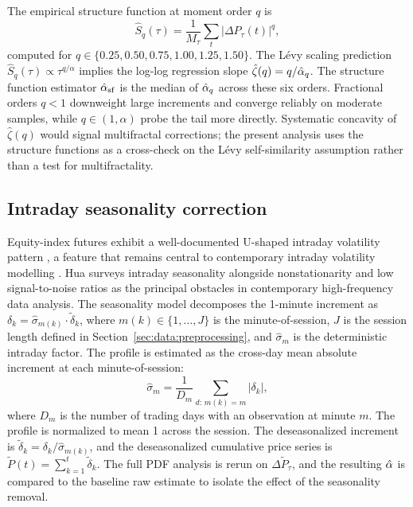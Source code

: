 \documentclass[conference]{IEEEtran}
\begin{document}
The empirical structure function at moment order $q$ is
\begin{equation}
  \hat{S}_q(\tau)
  = \frac{1}{M_\tau}\sum_t |\Delta P_\tau(t)|^q,
  \label{eq:sf}
\end{equation}
computed for $q\in\{0.25,0.50,0.75,1.00,1.25,1.50\}$.
The Lévy scaling prediction $\hat{S}_q(\tau) \propto \tau^{q/\alpha}$ implies
the log-log regression slope $\hat\zeta(q) = q/\hat{\alpha}_q$. The
structure function estimator $\hat{\alpha}_{\mathrm{sf}}$ is the median of
$\hat{\alpha}_q$ across these six orders. Fractional orders $q<1$ downweight
large increments and converge reliably on moderate samples, while
$q\in(1,\alpha)$ probe the tail more directly. Systematic concavity of
$\hat\zeta(q)$ would signal multifractal corrections; the present analysis
uses the structure functions as a cross-check on the Lévy self-similarity
assumption rather than a test for multifractality.

\subsection{Intraday seasonality correction}
\label{sec:methodology:seasonality}

Equity-index futures exhibit a well-documented U-shaped intraday volatility
pattern \cite{AndersenBollerslev1997,Chakraborti2011}, a
feature that remains central to contemporary intraday volatility
modelling \cite{Liang2023,Zhang2024}. Hua \cite{Hua2025} surveys intraday
seasonality alongside nonstationarity and low signal-to-noise ratios as the
principal obstacles in contemporary high-frequency data analysis. The
seasonality model decomposes the 1-minute increment as $\delta_k =
\hat\sigma_{m(k)}\cdot\tilde\delta_k$, where $m(k)\in\{1,\ldots,J\}$ is the
minute-of-session, $J$ is the session length defined in
Section~\ref{sec:data:preprocessing}, and $\hat\sigma_m$ is the deterministic
intraday factor. The
profile is estimated as the cross-day mean absolute increment at each
minute-of-session:
\begin{equation}
  \hat\sigma_m
  = \frac{1}{D_m}\sum_{d:\,m(k)=m}|\delta_k|,
  \label{eq:profile}
\end{equation}
where $D_m$ is the number of trading days with an observation at minute $m$.
The profile is normalized to mean 1 across the session. The deseasonalized
increment is $\tilde\delta_k = \delta_k/\hat\sigma_{m(k)}$, and the
deseasonalized cumulative price series is $\tilde{P}(t)
= \sum_{k=1}^t\tilde\delta_k$. The full PDF analysis is rerun on
$\Delta\tilde{P}_\tau$, and the resulting $\hat{\alpha}$ is compared to the
baseline raw estimate to isolate the effect of the seasonality removal.
\end{document}
